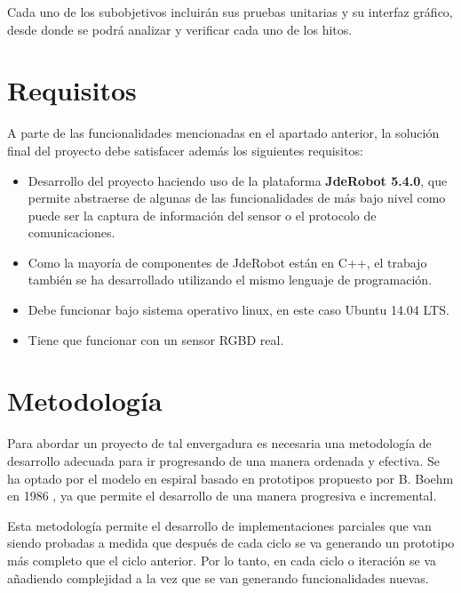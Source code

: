 Cada uno de los subobjetivos incluirán sus pruebas unitarias y su interfaz gráfico, desde donde se podrá analizar y verificar cada uno de los hitos.

\section{Requisitos}

A parte de las funcionalidades mencionadas en el apartado anterior, la solución final del proyecto debe satisfacer además los siguientes requisitos:

\begin{itemize}

\item Desarrollo del proyecto haciendo uso de la plataforma \textbf{JdeRobot 5.4.0}, que permite abstraerse de algunas de las funcionalidades de más bajo nivel como puede ser la captura de información del sensor o el protocolo de comunicaciones.

\item Como la mayoría de componentes de JdeRobot están en C++, el trabajo también se ha desarrollado utilizando el mismo lenguaje de programación.

\item Debe funcionar bajo sistema operativo linux, en este caso Ubuntu 14.04 LTS.


\item Tiene que funcionar con un sensor RGBD real.

\end{itemize}


\section{Metodología}

Para abordar un proyecto de tal envergadura es necesaria una metodología de desarrollo adecuada para ir progresando de una manera ordenada y efectiva. Se ha optado por el modelo en espiral basado en prototipos propuesto por B. Boehm en 1986 \parencite{Reference7}, ya que permite el desarrollo de una manera progresiva e incremental. 

Esta metodología permite el desarrollo de implementaciones parciales que van siendo probadas a medida que después de cada ciclo se va generando un prototipo más completo que el ciclo anterior. Por lo tanto, en cada ciclo o iteración se va añadiendo complejidad a la vez que se van generando funcionalidades nuevas.

